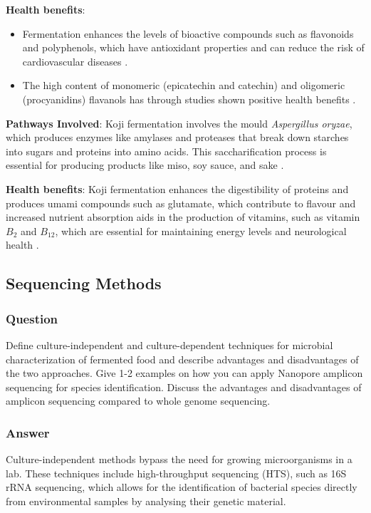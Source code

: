 \textbf{Health benefits}:
\begin{itemize}
    \item Fermentation enhances the levels of bioactive compounds such as flavonoids and polyphenols, which have antioxidant properties and can reduce the risk of cardiovascular diseases \cite*{ORM_1}.
    \item The high content of monomeric (epicatechin and catechin) and oligomeric (procyanidins) flavanols has through studies shown positive health benefits \cite*{ORM_1}.
\end{itemize}

\textbf{Pathways Involved}: Koji fermentation involves the mould \textit{Aspergillus oryzae}, which produces enzymes like amylases and proteases that break down starches into sugars and proteins into amino acids. This saccharification process is essential for producing products like miso, soy sauce, and sake \cite*{LS11}.

\textbf{Health benefits}:
Koji fermentation enhances the digestibility of proteins and produces umami compounds such as glutamate, which contribute to flavour and increased nutrient absorption aids in the production of vitamins, such as vitamin $B_2$ and $B_{12}$, which are essential for maintaining energy levels and neurological health \cite*{LS11}.

\subsection{Sequencing Methods}
\subsubsection*{Question}
Define culture-independent and culture-dependent techniques for microbial characterization of fermented food and describe advantages and disadvantages of the two approaches. Give 1-2 examples on how you can apply Nanopore amplicon sequencing for species identification. Discuss the advantages and disadvantages of amplicon sequencing compared to whole genome sequencing. 

\subsubsection*{Answer}
Culture-independent methods bypass the need for growing microorganisms in a lab. These techniques include high-throughput sequencing (HTS), such as 16S rRNA sequencing, which allows for the identification of bacterial species directly from environmental samples by analysing their genetic material.

